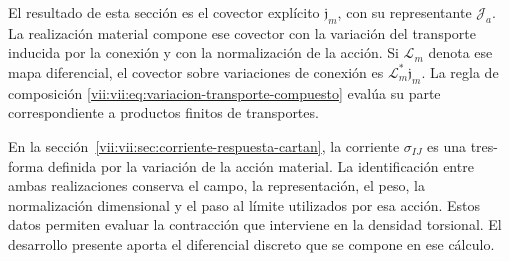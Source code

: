 El resultado de esta sección es el covector explícito
\(\mathfrak j_m\), con su representante \(\mathcal J_a\).
La realización material compone ese covector con la variación del
transporte inducida por la conexión y con la normalización de la acción.
Si \(\mathcal L_m\) denota ese mapa diferencial, el covector sobre
variaciones de conexión es \(\mathcal L_m^*\mathfrak j_m\).
La regla de composición
\eqref{vii:vii:eq:variacion-transporte-compuesto} evalúa su parte
correspondiente a productos finitos de transportes.

En la sección~\ref{vii:vii:sec:corriente-respuesta-cartan}, la corriente
\(\sigma_{IJ}\) es una tres-forma definida por la variación de la acción
material. La identificación entre ambas realizaciones conserva el campo,
la representación, el peso, la normalización dimensional y el paso al
límite utilizados por esa acción. Estos datos permiten evaluar la
contracción que interviene en la densidad torsional. El desarrollo
presente aporta el diferencial discreto que se compone en ese cálculo.
